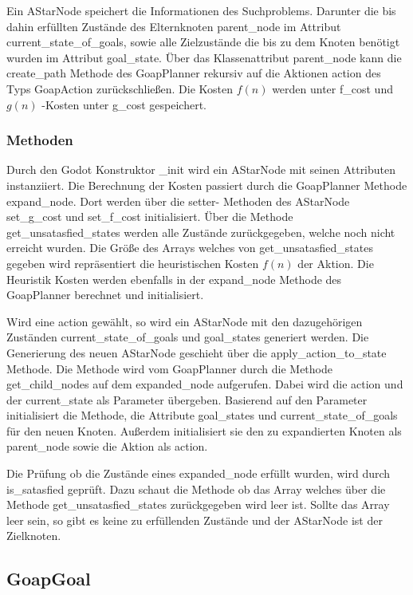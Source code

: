 Ein AStarNode speichert die Informationen des Suchproblems. Darunter die bis dahin erfüllten Zustände des Elternknoten parent\_node im Attribut current\_state\_of\_goals, sowie alle Zielzustände die bis zu dem Knoten benötigt wurden im Attribut goal\_state. \"{U}ber das Klassenattribut parent\_node kann die create\_path Methode des GoapPlanner rekursiv auf die Aktionen action des Typs GoapAction zurückschlie\ss{}en. Die Kosten $f(n)$ werden unter f\_cost und $g(n)$ -Kosten unter g\_cost gespeichert.


\subsubsection{Methoden}
\label{chap:astarnode methoden}

Durch den Godot Konstruktor \_init wird ein AStarNode mit seinen Attributen instanziiert. Die Berechnung der Kosten passiert durch die GoapPlanner Methode expand\_node. Dort werden über die setter- Methoden des AStarNode set\_g\_cost und set\_f\_cost initialisiert. \"{U}ber die Methode get\_unsatasfied\_states werden alle Zustände zurückgegeben, welche noch nicht erreicht wurden. Die Grö\ss{}e des Arrays welches von get\_unsatasfied\_states gegeben wird repräsentiert die heuristischen Kosten $f(n)$ der Aktion. Die Heuristik Kosten werden ebenfalls in der expand\_node Methode des GoapPlanner berechnet und initialisiert.

Wird eine action gewählt, so wird ein AStarNode mit den dazugehörigen Zuständen current\_state\_of\_goals und goal\_states generiert werden. Die Generierung des neuen AStarNode geschieht über die apply\_action\_to\_state Methode. Die Methode wird vom GoapPlanner durch die Methode get\_child\_nodes auf dem expanded\_node aufgerufen. Dabei wird die action und der current\_state als Parameter übergeben. Basierend auf den Parameter initialisiert die Methode, die Attribute goal\_states und current\_state\_of\_goals für den neuen Knoten. Au\ss{}erdem initialisiert sie den zu expandierten Knoten als parent\_node sowie die Aktion als action.

Die Prüfung ob die Zustände eines expanded\_node erfüllt wurden, wird durch is\_satasfied geprüft. Dazu schaut die Methode ob das Array welches über die Methode get\_unsatasfied\_states zurückgegeben wird leer ist. Sollte das Array leer sein, so gibt es keine zu erfüllenden Zustände und der AStarNode ist der Zielknoten.


\subsection{GoapGoal}
\label{chap:goapgoal uml}

